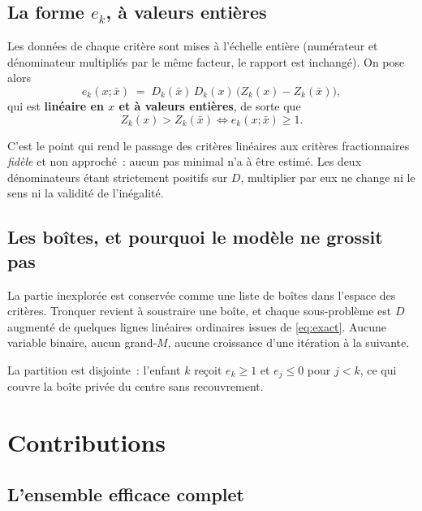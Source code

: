 \documentclass[12pt,a4paper]{report}
\newcommand{\Dset}{D}
\newcommand{\Z}{Z}
\newcommand{\fig}[1]{}
\theoremstyle{plain}
\theoremstyle{definition}
\begin{document}
\section{La forme \texorpdfstring{$e_k$}{e\_k}, à valeurs entières}
\label{sec:ek}

Les données de chaque critère sont mises à l'échelle entière (numérateur et
dénominateur multipliés par le même facteur, le rapport est inchangé).  On
pose alors
\begin{equation}\label{eq:ek}
  e_k(x ; \bar x) \;=\; D_k(\bar x)\,D_k(x)\,
  \bigl(\Z_k(x) - \Z_k(\bar x)\bigr) ,
\end{equation}
qui est \textbf{linéaire en $x$ et à valeurs entières}, de sorte que
\begin{equation}\label{eq:exact}
  \Z_k(x) > \Z_k(\bar x) \iff e_k(x;\bar x) \geqslant 1 .
\end{equation}

\noindent
C'est le point qui rend le passage des critères linéaires aux critères
fractionnaires \emph{fidèle} et non approché~: aucun pas minimal n'a à être
estimé.  Les deux dénominateurs étant strictement positifs sur $\Dset$,
multiplier par eux ne change ni le sens ni la validité de l'inégalité.

\section{Les boîtes, et pourquoi le modèle ne grossit pas}
\label{sec:boites}

La partie inexplorée est conservée comme une liste de boîtes dans l'espace des
critères.  Tronquer revient à soustraire une boîte, et chaque sous-problème est
$\Dset$ augmenté de quelques lignes linéaires ordinaires issues de
\eqref{eq:exact}.  Aucune variable binaire, aucun grand-$M$, aucune croissance
d'une itération à la suivante.

La partition est disjointe~: l'enfant $k$ reçoit $e_k \geqslant 1$ et
$e_j \leqslant 0$ pour $j < k$, ce qui couvre la boîte privée du centre sans
recouvrement.

\begin{center}
\fig{h-process}
\end{center}


\chapter{Contributions}
\label{ch:contrib}

\section{L'ensemble efficace complet}
\label{sec:complet}
\end{document}
